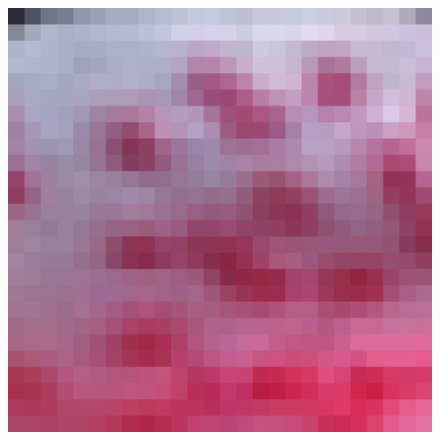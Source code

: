 \documentclass[review,numbers,sort&compress]{elsarticle}  %
\begin{document}
\begin{figure}[htbp]
{\begin{minipage}[b]{0.12\textwidth}
                \includegraphics[width=1\textwidth]{compareImage/PLHT_flower_mag_2.png}
            \end{minipage}
        }
\end{figure}
\end{document}
